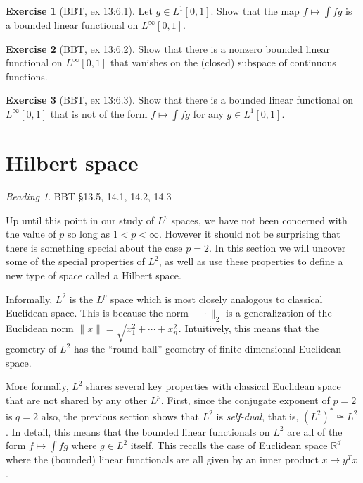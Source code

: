 \documentclass[11pt,oneside]{amsbook}
\newcommand{\RR}{{\mathbb R}}
\theoremstyle{definition}
\newtheorem{exerc}{Exercise}[section]
\theoremstyle{plain}
\theoremstyle{definition}
\theoremstyle{remark}
\newtheorem*{reading}{Reading}
\numberwithin{equation}{section}
\numberwithin{figure}{section}
\begin{document}
\begin{exerc}[BBT, ex 13:6.1]
  Let $g\in L^1[0,1]$. Show that the map $f\mapsto\int fg$ is a bounded linear functional on $L^\infty[0,1]$.
\end{exerc}

\begin{exerc}[BBT, ex 13:6.2]
  Show that there is a nonzero bounded linear functional on $L^\infty[0,1]$ that vanishes on the (closed) subspace of continuous functions.
\end{exerc}

\begin{exerc}[BBT, ex 13:6.3]
  Show that there is a bounded linear functional on $L^\infty[0,1]$ that is not of the form $f\mapsto\int fg$ for any $g\in L^1[0,1]$.
\end{exerc}

\newpage
\section{Hilbert space}

\begin{reading}
  BBT \S 13.5, 14.1, 14.2, 14.3
\end{reading}


Up until this point in our study of $L^p$ spaces, we have not been concerned with the value of $p$ so long as $1<p<\infty$. However it should not be surprising that there is something special about the case $p=2$. In this section we will uncover some of the special properties of $L^2$, as well as use these properties to define a new type of space called a Hilbert space.

Informally, $L^2$ is the $L^p$ space which is most closely analogous to classical Euclidean space. This is because the norm $\|\cdot\|_2$ is a generalization of the Euclidean norm $\|x\|=\sqrt{x_1^2+\cdots+x_n^2}$. Intuitively, this means that the geometry of $L^2$ has the ``round ball'' geometry of finite-dimensional Euclidean space.

More formally, $L^2$ shares several key properties with classical Euclidean space that are not shared by any other $L^p$. First, since the conjugate exponent of $p=2$ is $q=2$ also, the previous section shows that $L^2$ is \emph{self-dual}, that is, $(L^2)^*\cong L^2$. In detail, this means that the bounded linear functionals on $L^2$ are all of the form $f\mapsto\int fg$ where $g\in L^2$ itself. This recalls the case of Euclidean space $\RR^d$ where the (bounded) linear functionals are all given by an inner product $x\mapsto y^Tx$.
\end{document}
